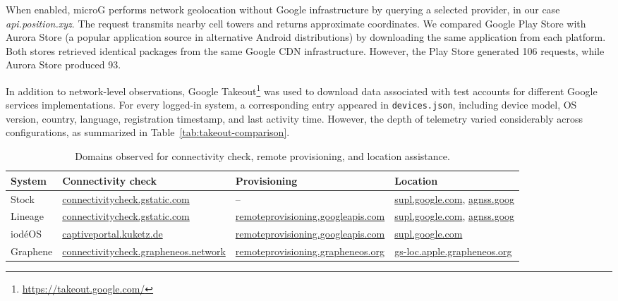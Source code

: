 When enabled, microG performs network geolocation without Google infrastructure by querying a selected provider, in our case \textit{api.position.xyz}. The request transmits nearby cell towers and returns approximate coordinates. We compared Google Play Store with Aurora Store (a popular application source in alternative Android distributions) by downloading the same application from each platform. Both stores retrieved identical packages from the same Google CDN infrastructure. However, the Play Store generated 106 requests, while Aurora Store produced 93.

In addition to network-level observations, Google Takeout\footnote{\url{https://takeout.google.com/}} was used to download data associated with test accounts for different Google services implementations. For every logged-in system, a corresponding entry appeared in \texttt{devices.json}, including device model, OS version, country, language, registration timestamp, and last activity time. However, the depth of telemetry varied considerably across configurations, as summarized in Table~\ref{tab:takeout-comparison}.

\begin{table}
	\caption{Domains observed for connectivity check, remote provisioning, and location assistance.}
	\label{tab:domains-mechanisms}
	
	\footnotesize
	\begin{tabular}{@{}p{}p{}p{}p{}@{}}
		\toprule
		System & Connectivity check& Provisioning & Location \\
		\midrule
		Stock & \url{connectivitycheck.gstatic.com} & -- & \url{supl.google.com}, \url{agnss.goog} \\
		Lineage & \url{connectivitycheck.gstatic.com} & \url{remoteprovisioning.googleapis.com} & \url{supl.google.com}, \url{agnss.goog} \\
		iod\'eOS & \url{captiveportal.kuketz.de} & \url{remoteprovisioning.googleapis.com} & \url{supl.google.com} \\
		Graphene & \url{connectivitycheck.grapheneos.network} & \url{remoteprovisioning.grapheneos.org} & \url{gs-loc.apple.grapheneos.org} \\
		\bottomrule
	\end{tabular}
\end{table}

